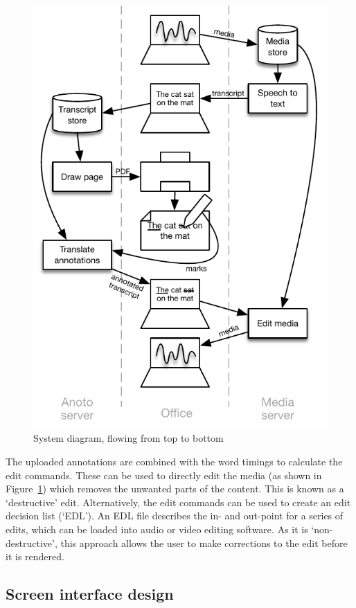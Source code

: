 \begin{figure}[ht]
  \centering
  \includegraphics[width=0.5\columnwidth]{figs/uist-sys-diagram}
  \caption{System diagram, flowing from top to bottom}
  \label{fig:diagram}
\end{figure}

The uploaded annotations are combined with the word timings to calculate the edit commands.  These can be used to
directly edit the media (as shown in Figure~\ref{fig:diagram}) which removes the unwanted parts of the content. This is
known as a `destructive' edit.  Alternatively, the edit commands can be used to create an edit decision list (`EDL').
An EDL file describes the in- and out-point for a series of edits, which can be loaded into audio or video editing
software.  As it is `non-destructive', this approach allows the user to make corrections to the edit before it is
rendered. 


\subsection{Screen interface design}

